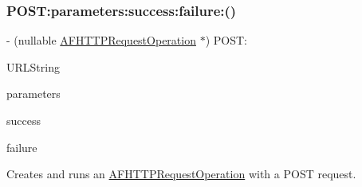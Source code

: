 \subsubsection{\texorpdfstring{P\+O\+S\+T\+:parameters\+:success\+:failure\+:()}{POST:parameters:success:failure:()}\hspace{0.1cm}{\footnotesize\ttfamily [1/3]}}
{\footnotesize\ttfamily -\/ (nullable \mbox{\hyperlink{interface_a_f_h_t_t_p_request_operation}{A\+F\+H\+T\+T\+P\+Request\+Operation}} $\ast$) P\+O\+S\+T\+: \begin{DoxyParamCaption}\item[{(N\+S\+String $\ast$)}]{U\+R\+L\+String }\item[{parameters:(nullable id)}]{parameters }\item[{success:(nullable void($^\wedge$)(\mbox{\hyperlink{interface_a_f_h_t_t_p_request_operation}{A\+F\+H\+T\+T\+P\+Request\+Operation}} $\ast$operation, id response\+Object))}]{success }\item[{failure:(nullable void($^\wedge$)(\mbox{\hyperlink{interface_a_f_h_t_t_p_request_operation}{A\+F\+H\+T\+T\+P\+Request\+Operation}} $\ast$\+\_\+\+\_\+nullable operation, N\+S\+Error $\ast$error))}]{failure }\end{DoxyParamCaption}}

Creates and runs an {\ttfamily \mbox{\hyperlink{interface_a_f_h_t_t_p_request_operation}{A\+F\+H\+T\+T\+P\+Request\+Operation}}} with a {\ttfamily P\+O\+ST} request.


